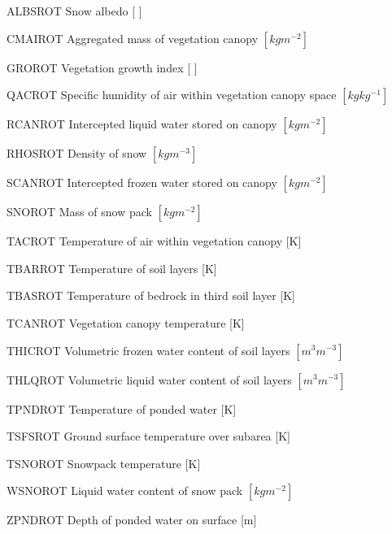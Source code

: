 \begin{DoxyItemize}
\item A\+L\+B\+S\+R\+O\+T Snow albedo \mbox{[} \mbox{]}
\item C\+M\+A\+I\+R\+O\+T Aggregated mass of vegetation canopy $[kg m^{-2} ]$
\item G\+R\+O\+R\+O\+T Vegetation growth index \mbox{[} \mbox{]}
\item Q\+A\+C\+R\+O\+T Specific humidity of air within vegetation canopy space $[kg kg^{-1} ]$
\item R\+C\+A\+N\+R\+O\+T Intercepted liquid water stored on canopy $[kg m^{-2} ]$
\item R\+H\+O\+S\+R\+O\+T Density of snow $[kg m^{-3} ]$
\item S\+C\+A\+N\+R\+O\+T Intercepted frozen water stored on canopy $[kg m^{-2} ]$
\item S\+N\+O\+R\+O\+T Mass of snow pack $[kg m^{-2} ]$
\item T\+A\+C\+R\+O\+T Temperature of air within vegetation canopy \mbox{[}K\mbox{]}
\item T\+B\+A\+R\+R\+O\+T Temperature of soil layers \mbox{[}K\mbox{]}
\item T\+B\+A\+S\+R\+O\+T Temperature of bedrock in third soil layer \mbox{[}K\mbox{]}
\item T\+C\+A\+N\+R\+O\+T Vegetation canopy temperature \mbox{[}K\mbox{]}
\item T\+H\+I\+C\+R\+O\+T Volumetric frozen water content of soil layers $[m^3 m^{-3} ]$
\item T\+H\+L\+Q\+R\+O\+T Volumetric liquid water content of soil layers $[m^3 m^{-3} ]$
\item T\+P\+N\+D\+R\+O\+T Temperature of ponded water \mbox{[}K\mbox{]}
\item T\+S\+F\+S\+R\+O\+T Ground surface temperature over subarea \mbox{[}K\mbox{]}
\item T\+S\+N\+O\+R\+O\+T Snowpack temperature \mbox{[}K\mbox{]}
\item W\+S\+N\+O\+R\+O\+T Liquid water content of snow pack $[kg m^{-2} ]$
\item Z\+P\+N\+D\+R\+O\+T Depth of ponded water on surface \mbox{[}m\mbox{]}
\end{DoxyItemize}

